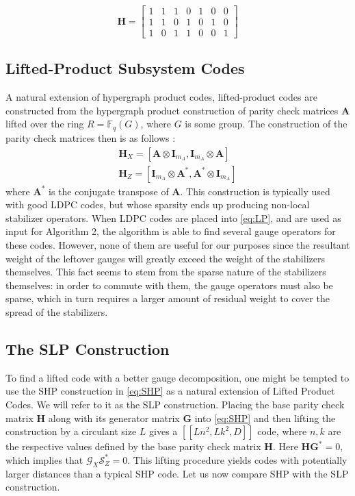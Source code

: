 \documentclass[conference]{IEEEtran}
\newcommand{\llbr}{[\![}
\newcommand{\rrbr}{]\!]}
\begin{document}
\begin{equation} 
\label{eq:Hamm} 
\boldsymbol{H}=
\begin{bmatrix}
    1&1&1&0&1&0&0\\
    1&1&0&1&0&1&0\\
    1&0&1&1&0&0&1
\end{bmatrix}
\end{equation}

\subsection{Lifted-Product Subsystem Codes}
A natural extension of hypergraph product codes, lifted-product codes are constructed from the hypergraph product construction of parity check matrices $\boldsymbol{A}$ lifted over the ring $R=\mathbb{F}_{q}(G)$, where $G$ is some group. The construction of the parity check matrices then is as follows \cite{panteleev2021quantum}:
\begin{align}
\label{eq:LP}
\boldsymbol{H}_{X}=\left[ \boldsymbol{A} \otimes \boldsymbol{I}_{m_{A}}, \boldsymbol{I}_{m_{A}} \otimes \boldsymbol{A} \right ] \\
\boldsymbol{H}_{Z}=\left[ \boldsymbol{I}_{m_{A}} \otimes \boldsymbol{A}^{*},  \boldsymbol{A}^{*}\otimes \boldsymbol{I}_{m_{A}} \right ] 
\end{align}
where $\boldsymbol{A}^{*}$ is the conjugate transpose of $\boldsymbol{A}$. This construction is typically used with good LDPC codes, but whose sparsity ends up producing non-local stabilizer operators. When LDPC codes are placed into \eqref{eq:LP}, and are used as input for Algorithm 2, the algorithm is able to find several gauge operators for these codes. However, none of them are useful for our purposes since the resultant weight of the leftover gauges will greatly exceed the weight of the stabilizers themselves. This fact seems to stem from the sparse nature of the stabilizers themselves: in order to commute with them, the gauge operators must also be sparse, which in turn requires a larger amount of residual weight to cover the spread of the stabilizers. \\ 
\subsection{The SLP Construction}
To find a lifted code with a better gauge decomposition, one might be tempted to use the SHP construction in \eqref{eq:SHP} as a natural extension of Lifted Product Codes. We will refer to it as the SLP construction. Placing the base parity check matrix $\boldsymbol{H}$ along with its generator matrix  $\boldsymbol{G}$ into \eqref{eq:SHP} and then lifting the construction by a circulant size $L$ gives a   $\llbr Ln^{2},Lk^{2},D \rrbr$ code, where $n,k$ are the respective values defined by the base parity check matrix $\boldsymbol{H}$. Here $\boldsymbol{H}\boldsymbol{G}^*=0$, which implies that $\mathcal{G}_{X}\mathcal{S}^*_{Z}=0$. This lifting procedure yields codes with potentially larger distances than a typical SHP code. Let us now compare SHP with the SLP construction.
\end{document}
